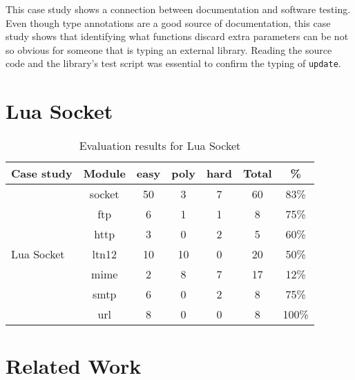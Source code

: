 This case study shows a connection between documentation and software testing.
Even though type annotations are a good source of documentation, this case
study shows that identifying what functions discard extra parameters can be
not so obvious for someone that is typing an external library.
Reading the source code and the library's test script was essential to confirm
the typing of \texttt{update}.

\section{Lua Socket}

\begin{table}[!ht]
\begin{center}
\begin{tabular}{|l|c|c|c|c|c|c|}
\hline
\textbf{Case study} & \textbf{Module} & \textbf{easy} & \textbf{poly} & \textbf{hard} & \textbf{Total} & \textbf{\%} \\
\hline
\multirow{7}{*}{Lua Socket}
& socket & 50 & 3 & 7 & 60 & 83\% \\
\cline{2-7}
& ftp & 6 & 1 & 1 & 8 & 75\% \\
\cline{2-7}
& http & 3 & 0 & 2 & 5 & 60\% \\
\cline{2-7}
& ltn12 & 10 & 10 & 0 & 20 & 50\% \\
\cline{2-7}
& mime & 2 & 8 & 7 & 17 & 12\% \\
\cline{2-7}
& smtp & 6 & 0 & 2 & 8 & 75\% \\
\cline{2-7}
& url & 8 & 0 & 0 & 8 & 100\% \\
\hline
\end{tabular}
\end{center}
\caption{Evaluation results for Lua Socket}
\label{tab:evalsocket}
\end{table}

\section{Related Work}
